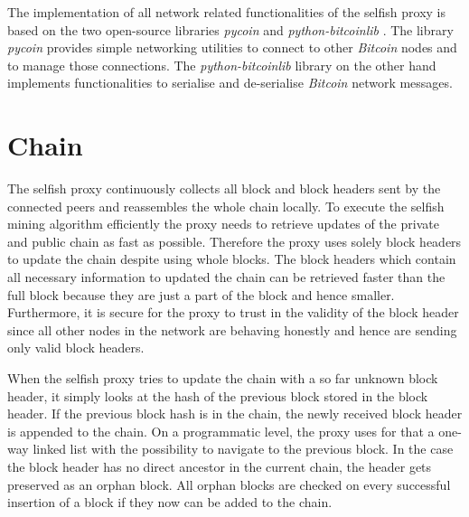 The implementation of all network related functionalities of the selfish proxy is based on the two open-source libraries \textit{pycoin} \cite{pycoin} and \textit{python-bitcoinlib} \cite{python-bitcoinlib}.
The library \textit{pycoin} provides simple networking utilities to connect to other \textit{Bitcoin} nodes and to manage those connections. 
The \textit{python-bitcoinlib} library on the other hand implements functionalities to serialise and de-serialise \textit{Bitcoin} network messages.

\section{Chain}

The selfish proxy continuously collects all block and block headers sent by the connected peers and reassembles the whole chain locally.
To execute the selfish mining algorithm efficiently the proxy needs to retrieve updates of the private and public chain as fast as possible.
Therefore the proxy uses solely block headers to update the chain despite using whole blocks.
The block headers which contain all necessary information to updated the chain can be retrieved faster than the full block because they are just a part of the block and hence smaller.
Furthermore, it is secure for the proxy to trust in the validity of the block header since all other nodes in the network are behaving honestly and hence are sending only valid block headers.

When the selfish proxy tries to update the chain with a so far unknown block header, it simply looks at the hash of the previous block stored in the block header.
If the previous block hash is in the chain, the newly received block header is appended to the chain.
On a programmatic level, the proxy uses for that a one-way linked list with the possibility to navigate to the previous block.
In the case the block header has no direct ancestor in the current chain, the header gets preserved as an orphan block.
All orphan blocks are checked on every successful insertion of a block if they now can be added to the chain.

